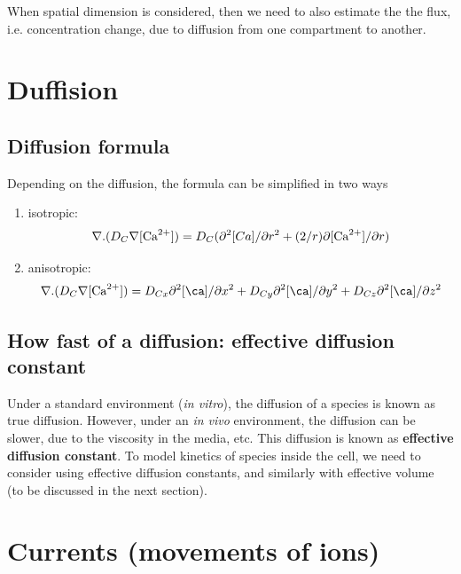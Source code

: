 When spatial dimension is considered, then we need to also estimate the
the flux, i.e. concentration change, due to diffusion from one compartment to
another.


\section{Duffision}
\label{sec:diffusion}

\subsection{Diffusion formula}

Depending on the diffusion, the
formula can be simplified in two ways
\begin{enumerate}
\item isotropic:
  \begin{equation}
    \label{eq:1430}
    \nabla.(D_C\nabla[{\text{Ca}^{2+}}]) = D_C(\partial^2[Ca]/\partial r^2 +
    (2/r)\partial[{\text{Ca}^{2+}}]/\partial r)
  \end{equation}

\item anisotropic:
  \begin{equation}
    \label{eq:1431}
    \nabla.(D_C\nabla[\Ca]) = D_{Cx}\partial^2[\ca]/\partial x^2 +
    D_{Cy}\partial^2[\ca]/\partial y^2 + D_{Cz}\partial^2[\ca]/\partial z^2 
  \end{equation}
\end{enumerate}


\subsection{How fast of a diffusion: effective diffusion constant}
\label{sec:effective-diffusion-constant}

Under a standard environment ({\it in vitro}), the diffusion of a species is
known as true diffusion. However, under an {\it in vivo} environment, the diffusion can be
slower, due to the viscosity in the media, etc. This diffusion is known as {\bf
effective diffusion constant}. To model kinetics of species inside the cell, we
need to consider using effective diffusion constants, and similarly with
effective volume (to be discussed in the next section).




\section{Currents (movements of ions)}
\label{sec:currents}

